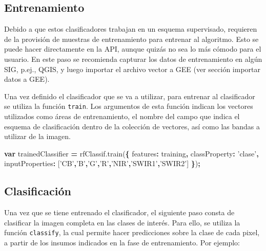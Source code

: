 \documentclass[
]{article}
\newenvironment{Shaded}{\begin{snugshade}}{\end{snugshade}}
\newcommand{\AttributeTok}[1]{\textcolor[rgb]{0.77,0.63,0.00}{#1}}
\newcommand{\DataTypeTok}[1]{\textcolor[rgb]{0.13,0.29,0.53}{#1}}
\newcommand{\KeywordTok}[1]{\textcolor[rgb]{0.13,0.29,0.53}{\textbf{#1}}}
\newcommand{\NormalTok}[1]{#1}
\newcommand{\OperatorTok}[1]{\textcolor[rgb]{0.81,0.36,0.00}{\textbf{#1}}}
\newcommand{\StringTok}[1]{\textcolor[rgb]{0.31,0.60,0.02}{#1}}
\newcommand{\VariableTok}[1]{\textcolor[rgb]{0.00,0.00,0.00}{#1}}
\begin{document}
\hypertarget{entrenamiento}{%
\subsection{Entrenamiento}\label{entrenamiento}}

Debido a que estos clasificadores trabajan en un esquema supervisado,
requieren de la provisión de muestras de entrenamiento para entrenar al
algoritmo. Esto se puede hacer directamente en la API, aunque quizás no
sea lo más cómodo para el usuario. En este paso se recomienda capturar
los datos de entrenamiento en algún SIG, p.ej., QGIS, y luego importar
el archivo vector a GEE (ver sección importar datos a GEE).

Una vez definido el clasificador que se va a utilizar, para entrenar al
clasificador se utiliza la función \texttt{train}. Los argumentos de
esta función indican los vectores utilizados como áreas de
entrenamiento, el nombre del campo que indica el esquema de
clasificación dentro de la colección de vectores, así como las bandas a
utilizar de la imagen.

\begin{Shaded}
\begin{Highlighting}[]
\KeywordTok{var}\NormalTok{ trainedClassifier }\OperatorTok{=} \VariableTok{rfClassif}\NormalTok{.}\AttributeTok{train}\NormalTok{(}\OperatorTok{\{}
  \DataTypeTok{features}\OperatorTok{:}\NormalTok{ training}\OperatorTok{,}
  \DataTypeTok{classProperty}\OperatorTok{:} \StringTok{'clase'}\OperatorTok{,}
  \DataTypeTok{inputProperties}\OperatorTok{:}\NormalTok{ [}\StringTok{'CB'}\OperatorTok{,}\StringTok{'B'}\OperatorTok{,}\StringTok{'G'}\OperatorTok{,}\StringTok{'R'}\OperatorTok{,}\StringTok{'NIR'}\OperatorTok{,}\StringTok{'SWIR1'}\OperatorTok{,}\StringTok{'SWIR2'}\NormalTok{]}
\OperatorTok{\}}\NormalTok{)}\OperatorTok{;}
\end{Highlighting}
\end{Shaded}

\hypertarget{clasificaciuxf3n}{%
\subsection{Clasificación}\label{clasificaciuxf3n}}

Una vez que se tiene entrenado el clasificador, el siguiente paso consta
de clasificar la imagen completa en las clases de interés. Para ello, se
utiliza la función \texttt{classify}, la cual permite hacer predicciones
sobre la clase de cada pixel, a partir de los insumos indicados en la
fase de entrenamiento. Por ejemplo:
\end{document}
